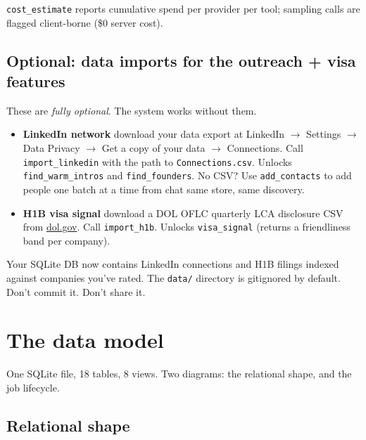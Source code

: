\documentclass[11pt,letterpaper]{article}
\newcommand{\tool}[1]{\texttt{#1}}
\newcommand{\fpath}[1]{\texttt{#1}}
\begin{document}
\tool{cost\_estimate} reports cumulative spend per provider per tool; sampling calls are flagged client-borne (\$0 server cost).

\subsection*{Optional: data imports for the outreach + visa features}

These are \textit{fully optional}. The system works without them.

\begin{itemize}
\item \textbf{LinkedIn network} \textemdash{} download your data export at LinkedIn $\rightarrow$ Settings $\rightarrow$ Data Privacy $\rightarrow$ Get a copy of your data $\rightarrow$ Connections. Call \tool{import\_linkedin} with the path to \fpath{Connections.csv}. Unlocks \tool{find\_warm\_intros} and \tool{find\_founders}. No CSV? Use \tool{add\_contacts} to add people one batch at a time from chat \textemdash{} same store, same discovery.
\item \textbf{H1B visa signal} \textemdash{} download a DOL OFLC quarterly LCA disclosure CSV from \href{https://www.dol.gov/agencies/eta/foreign-labor/performance}{dol.gov}. Call \tool{import\_h1b}. Unlocks \tool{visa\_signal} (returns a friendliness band per company).
\end{itemize}

\begin{warnbox}
Your SQLite DB now contains LinkedIn connections and H1B filings indexed against companies you've rated. The \fpath{data/} directory is gitignored by default. Don't commit it. Don't share it.
\end{warnbox}

\section{The data model}\label{sec:data}

One SQLite file, 18 tables, 8 views. Two diagrams: the relational shape, and the job lifecycle.

\subsection{Relational shape}
\end{document}
